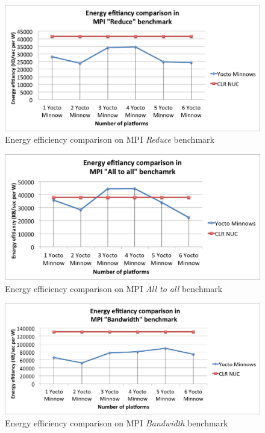 \begin{figure}[H]
\centering
\includegraphics[width=1 \textwidth]{images/energy_results/reduce.png}
\caption{Energy efficiency comparison on MPI \textit{Reduce} benchmark}
\label{reduce_energy}
\end{figure}


\begin{figure}[H]
\centering
\includegraphics[width=1 \textwidth]{images/energy_results/all_to_all.png}
\caption{Energy efficiency comparison on MPI \textit{All to all} benchmark}
\label{alltoall_energy}
\end{figure}


\begin{figure}[H]
\centering
\includegraphics[width=1 \textwidth]{images/energy_results/bandwidth.png}
\caption{Energy efficiency comparison on MPI \textit{Bandwidth} benchmark}
\label{bandwidth_energy}
\end{figure}

